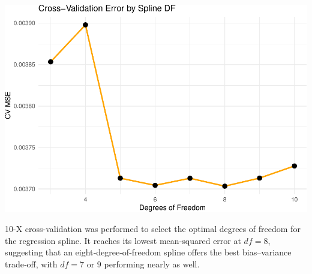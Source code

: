 \documentclass[
]{article}
\begin{document}
\includegraphics{chapter-07-hw_files/figure-latex/unnamed-chunk-9-1.pdf}

10-X cross-validation was performed to select the optimal degrees of
freedom for the regression spline. It reaches its lowest mean‑squared
error at \(df =8\), suggesting that an eight‑degree‑of‑freedom spline
offers the best bias--variance trade‑off, with \(df=7 \text{ or }9\)
performing nearly as well.
\end{document}
